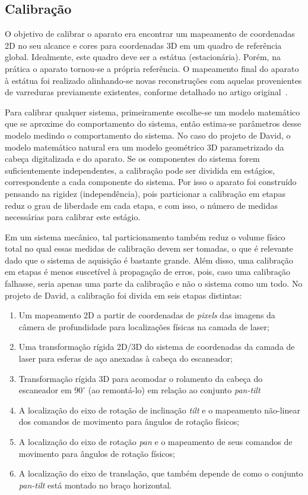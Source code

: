 \subsection{Calibração}

O objetivo de calibrar o aparato era encontrar um mapeamento de coordenadas 2D
no seu alcance e cores para coordenadas 3D em um quadro de referência global.
Idealmente, este quadro deve ser a estátua (estacionária). Porém, 
na prática o aparato tornou-se a própria referência. O mapeamento final do aparato à estátua
foi realizado alinhando-se novas reconstruções com aquelas provenientes de varreduras previamente 
existentes, conforme detalhado no artigo original~\cite{levoy2000digital}.

Para calibrar qualquer sistema, primeiramente escolhe-se um modelo matemático
que se aproxime do comportamento do sistema, então estima-se parâmetros desse
modelo medindo o comportamento do sistema. No caso do projeto de David, o
modelo matemático natural era um modelo geométrico 3D parametrizado da cabeça
digitalizada e do aparato. Se os componentes do sistema forem suficientemente
independentes, a calibração pode ser dividida em estágios, correspondente a
cada componente do sistema. Por isso o aparato foi construído pensando na
rigidez (independência), pois particionar a calibração em etapas reduz o grau
de liberdade em cada etapa, e com isso, o número de medidas necessárias para
calibrar este estágio.

Em um sistema mecânico, tal particionamento também reduz o volume físico total no qual essas
medidas de calibração devem ser tomadas, o que é relevante dado que o sistema
de aquisição é bastante grande. Além disso, uma calibração em etapas é menos
suscetível à propagação de erros, pois, caso uma calibração falhasse, seria
apenas uma parte da calibração e não o sistema como um todo. No projeto de
David, a calibração foi divida em seis etapas distintas:

\begin{enumerate}
\item{Um mapeamento 2D a partir de coordenadas de \emph{pixels} das imagens da
  câmera de profundidade para localizações físicas na camada de laser;}
\item{Uma transformação rígida 2D/3D do sistema de coordenadas da camada de
    laser para esferas de aço anexadas à cabeça do escaneador;}
\item{Transformação rígida 3D para acomodar o rolamento da cabeça do escaneador 
    em $90^{\circ}$ (ao remontá-lo) em relação ao conjunto \emph{pan-tilt}}
  \item{A localização do eixo de rotação de inclinação \emph{tilt} e o mapeamento não-linear
  dos comandos de movimento para ângulos de rotação físicos;}
\item{A localização do eixo de rotação \emph{pan} e o mapeamento de seus
  comandos de movimento para ângulos de rotação físicos;}
\item{A localização do eixo de translação, que também depende de como o
    conjunto \emph{pan-tilt} está montado no braço horizontal.}
\end{enumerate}


